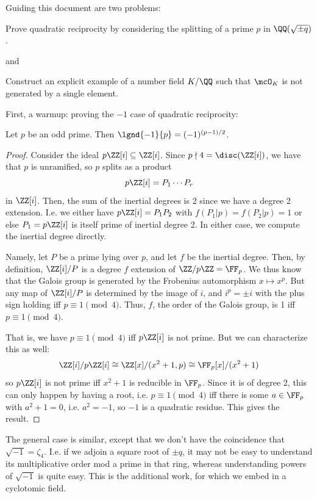 Guiding this document are two problems:

\begin{exercise} Prove quadratic reciprocity by considering the splitting of a prime $p$ in $\QQ(\sqrt{\pm q})$. \end{exercise}

and

\begin{exercise} Construct an explicit example of a number field $K/\QQ$ such that $\mcO_K$ is not generated by a single element. \end{exercise}

First, a warmup: proving the $-1$ case of quadratic reciprocity:

\begin{thm} Let $p$ be an odd prime. Then $\lgnd{-1}{p} = (-1)^{(p-1)/2}$. \end{thm}
\begin{proof}
	Consider the ideal $p\ZZ[i] \subseteq \ZZ[i]$. Since $p \nmid 4 = \disc(\ZZ[i])$, we have that $p$ is unramified, so $p$ splits as a product
	\[ p\ZZ[i] = P_1\cdots P_r \]
	in $\ZZ[i]$. Then, the sum of the inertial degrees is 2 since we have a degree 2 extension. I.e. we either have $p\ZZ[i] = P_1P_2$ with $f(P_1|p) = f(P_2|p) = 1$ or else $P_1 = p\ZZ[i]$ is itself prime of inertial degree 2. In either case, we compute the inertial degree directly.
	
	Namely, let $P$ be a prime lying over $p$, and let $f$ be the inertial degree. Then, by definition, $\ZZ[i]/P$ is a degree $f$ extension of $\ZZ/p\ZZ = \FF_p$. We thus know that the Galois group is generated by the Frobenius automorphism $x \mapsto x^p$. But any map of $\ZZ[i]/P$ is determined by the image of $i$, and $i^p = \pm i$ with the plus sign holding iff $p \equiv 1 \pmod{4}$. Thus, $f$, the order of the Galois group, is 1 iff $p \equiv 1 \pmod{4}$.
	
	That is, we have $p \equiv 1 \pmod{4}$ iff $p\ZZ[i]$ is not prime. But we can characterize this as well:
	\[ \ZZ[i]/p\ZZ[i] \cong \ZZ[x]/(x^2+1,p) \cong \FF_p[x]/(x^2+1) \]
	so $p\ZZ[i]$ is not prime iff $x^2+1$ is reducible in $\FF_p$. Since it is of degree 2, this can only happen by having a root, i.e. $p \equiv 1 \pmod{4}$ iff there is some $a \in \FF_p$ with $a^2+1=0$, i.e. $a^2=-1$, so $-1$ is a quadratic residue. This gives the result.
\end{proof}

The general case is similar, except that we don't have the coincidence that $\sqrt{-1} = \zeta_4$. I.e. if we adjoin a square root of $\pm q$, it may not be easy to understand its multiplicative order mod a prime in that ring, whereas understanding powers of $\sqrt{-1}$ is quite easy. This is the additional work, for which we embed in a cyclotomic field.

